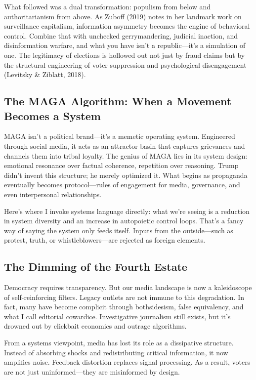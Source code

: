 What followed was a dual transformation: populism from below and
authoritarianism from above. As Zuboff (2019) notes in her landmark work
on surveillance capitalism, information asymmetry becomes the engine of
behavioral control. Combine that with unchecked gerrymandering, judicial
inaction, and disinformation warfare, and what you have isn't a
republic---it's a simulation of one. The legitimacy of elections is
hollowed out not just by fraud claims but by the structural engineering
of voter suppression and psychological disengagement (Levitsky \&
Ziblatt, 2018).

\subsection{The MAGA Algorithm: When a Movement Becomes a
System}\label{the-maga-algorithm-when-a-movement-becomes-a-system}

MAGA isn't a political brand---it's a memetic operating system.
Engineered through social media, it acts as an attractor basin that
captures grievances and channels them into tribal loyalty. The genius of
MAGA lies in its system design: emotional resonance over factual
coherence, repetition over reasoning. Trump didn't invent this
structure; he merely optimized it. What begins as propaganda eventually
becomes protocol---rules of engagement for media, governance, and even
interpersonal relationships.

Here's where I invoke systems language directly: what we're seeing is a
reduction in system diversity and an increase in autopoietic control
loops. That's a fancy way of saying the system only feeds itself. Inputs
from the outside---such as protest, truth, or whistleblowers---are
rejected as foreign elements.

\subsection{The Dimming of the Fourth
Estate}\label{the-dimming-of-the-fourth-estate}

Democracy requires transparency. But our media landscape is now a
kaleidoscope of self-reinforcing filters. Legacy outlets are not immune
to this degradation. In fact, many have become complicit through
bothsidesism, false equivalency, and what I call editorial cowardice.
Investigative journalism still exists, but it's drowned out by clickbait
economics and outrage algorithms.

From a systems viewpoint, media has lost its role as a dissipative
structure. Instead of absorbing shocks and redistributing critical
information, it now amplifies noise. Feedback distortion replaces signal
processing. As a result, voters are not just uninformed---they are
misinformed by design.

